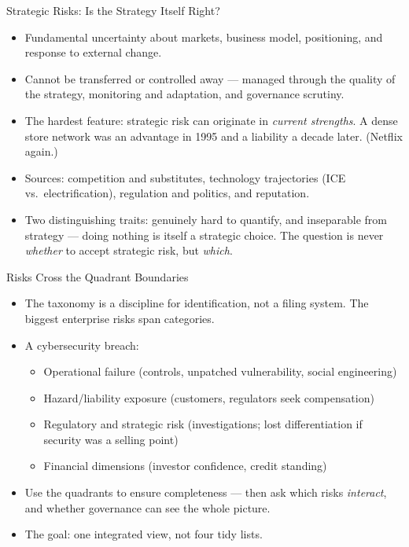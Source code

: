 \documentclass[11pt, aspectratio=169]{beamer}
\begin{document}
\begin{frame}{Strategic Risks: Is the Strategy Itself Right?}
\begin{itemize}
  \item Fundamental uncertainty about markets, business model, positioning, and response to external change.
  \item Cannot be transferred or controlled away --- managed through the \alert{quality of the strategy}, monitoring and adaptation, and governance scrutiny.
  \item The hardest feature: strategic risk can originate in \emph{current strengths}. A dense store network was an advantage in 1995 and a liability a decade later. (Netflix again.)
  \item Sources: competition and substitutes, technology trajectories (ICE vs.\ electrification), regulation and politics, and \alert{reputation}.
  \item Two distinguishing traits: genuinely hard to quantify, and inseparable from strategy --- doing nothing is itself a strategic choice. The question is never \emph{whether} to accept strategic risk, but \emph{which}.
\end{itemize}
\end{frame}

\begin{frame}{Risks Cross the Quadrant Boundaries}
\begin{itemize}
  \item The taxonomy is a discipline for identification, not a filing system. The biggest enterprise risks span categories.
  \item A \alert{cybersecurity breach}:
  \begin{itemize}
    \item Operational failure (controls, unpatched vulnerability, social engineering)
    \item Hazard/liability exposure (customers, regulators seek compensation)
    \item Regulatory and strategic risk (investigations; lost differentiation if security was a selling point)
    \item Financial dimensions (investor confidence, credit standing)
  \end{itemize}
  \item Use the quadrants to ensure completeness --- then ask which risks \emph{interact}, and whether governance can see the whole picture.
  \item The goal: \alert{one integrated view, not four tidy lists}.
\end{itemize}
\end{frame}
\end{document}

